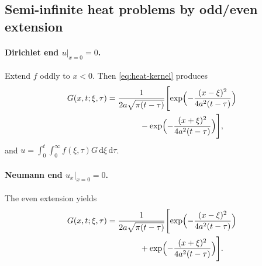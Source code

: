 \subsection{Semi-infinite heat problems by odd/even extension}

\paragraph{Dirichlet end $u|_{x=0}=0$.}
Extend $f$ oddly to $x<0$. Then \eqref{eq:heat-kernel} produces
\begin{equation}
\begin{aligned}
G(x,t;\xi,\tau)
&=\frac{1}{2a\sqrt{\pi(t-\tau)}}
\Biggl[
\exp\Bigl(-\frac{(x-\xi)^2}{4a^2(t-\tau)}\Bigr)\\
&\qquad\qquad
-\exp\Bigl(-\frac{(x+\xi)^2}{4a^2(t-\tau)}\Bigr)
\Biggr],
\end{aligned}
\end{equation}
and $u=\int_0^t\int_0^{\infty}f(\xi,\tau)G\,\mathrm{d}\xi\,\mathrm{d}\tau$.

\paragraph{Neumann end $u_x|_{x=0}=0$.}
The even extension yields
\begin{equation}
\begin{aligned}
G(x,t;\xi,\tau)
&=\frac{1}{2a\sqrt{\pi(t-\tau)}}
\Biggl[
\exp\Bigl(-\frac{(x-\xi)^2}{4a^2(t-\tau)}\Bigr)\\
&\qquad\qquad
+\exp\Bigl(-\frac{(x+\xi)^2}{4a^2(t-\tau)}\Bigr)
\Biggr].
\end{aligned}
\end{equation}
